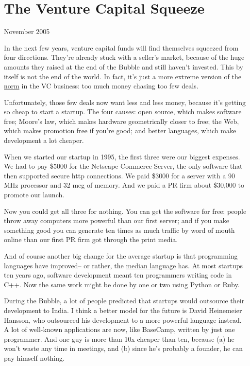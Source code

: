 \chapter{The Venture Capital Squeeze}

November 2005

In the next few years, venture capital funds will find themselves
squeezed from four directions. They're already stuck with a seller's
market, because of the huge amounts they raised at the end of the Bubble
and still haven't invested. This by itself is not the end of the world.
In fact, it's just a more extreme version of the
\href{http://www.archub.org/dilbertvc.gif}{norm} in the VC business: too
much money chasing too few deals.

Unfortunately, those few deals now want less and less money, because
it's getting so cheap to start a startup. The four causes: open source,
which makes software free; Moore's law, which makes hardware
geometrically closer to free; the Web, which makes promotion free if
you're good; and better languages, which make development a lot cheaper.

When we started our startup in 1995, the first three were our biggest
expenses. We had to pay \$5000 for the Netscape Commerce Server, the
only software that then supported secure http connections. We paid
\$3000 for a server with a 90 MHz processor and 32 meg of memory. And we
paid a PR firm about \$30,000 to promote our launch.

Now you could get all three for nothing. You can get the software for
free; people throw away computers more powerful than our first server;
and if you make something good you can generate ten times as much
traffic by word of mouth online than our first PR firm got through the
print media.

And of course another big change for the average startup is that
programming languages have improved-- or rather, the
\href{avg.html}{median language} has. At most startups ten years ago,
software development meant ten programmers writing code in C++. Now the
same work might be done by one or two using Python or Ruby.

During the Bubble, a lot of people predicted that startups would
outsource their development to India. I think a better model for the
future is David Heinemeier Hansson, who outsourced his development to a
more powerful language instead. A lot of well-known applications are
now, like BaseCamp, written by just one programmer. And one guy is more
than 10x cheaper than ten, because (a) he won't waste any time in
meetings, and (b) since he's probably a founder, he can pay himself
nothing.

